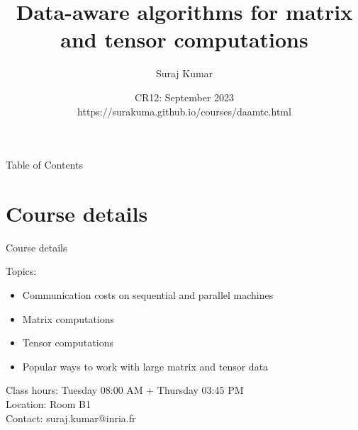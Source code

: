 \documentclass[
	12pt, %
]{beamer}
\title[Data-aware algorithms]{Data-aware algorithms for matrix and tensor computations} %
\author[Suraj Kumar]{Suraj Kumar} %
\institute[Inria \& ENS Lyon]{Inria \& ENS Lyon \\ \smallskip Email:\textit{suraj.kumar@inria.fr}} %
\date[CR12]{CR12: September 2023\\ \smallskip\small https://surakuma.github.io/courses/daamtc.html} %
\newcommand{\brown}[1]{{\color{brown} #1 }}
\begin{document}

\begin{frame}
	\titlepage %
\end{frame}



\begin{frame}{Table of Contents} 
	\tableofcontents[currentsection] %
\end{frame}
\section{Course details}

\begin{frame}{Course details}

\brown{Topics:}
	\begin{itemize}
		\item Communication costs on sequential and parallel machines
		\item Matrix computations
		\item Tensor computations
		\item Popular ways to work with large matrix and tensor data
	\end{itemize}
\vfill
\brown{Class hours:} Tuesday 08:00 AM + Thursday  03:45 PM\\
\vfill
\brown{Location:} Room B1\\
\vfill
\brown{Contact:} suraj.kumar@inria.fr 
\end{frame}
\end{document}
